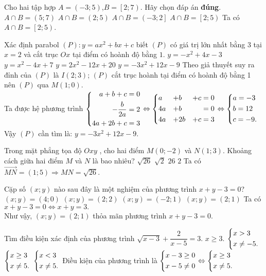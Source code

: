 \begin{ex}%
Cho hai tập hợp  $A=\left( -3;5 \right)$,$B=\left[ 2;7 \right)$. Hãy chọn đáp án \textbf{đúng}.
\choice
{ $A\cap B=\left( 5;7 \right)$}
{ $A\cap B=\left( 2;5 \right)$}
{ $A\cap B=\left( -3;2 \right]$}
{\True  $A\cap B=\left[ 2;5 \right)$}
	\loigiai
	{Ta có $A\cap B=\left[ 2;5 \right)$.
	}
\end{ex}
\begin{ex}%
 Xác định parabol $(P):y=ax^2+bx+c$  biết $(P)$ có giá trị lớn nhất bằng $3$ tại $x=2$ và cắt trục $Ox$ tại điểm có hoành độ bằng $1$.
\choice
{ $y=-x^2+4x-3$}
{ $y=x^2-4x+7$}
{ $y=2x^2-12x+20$}
{\True  $y=-3x^2+12x-9$}
\loigiai
	{Theo giả thuyết suy ra đỉnh của $ (P) $ là $ I(2;3) $; $ (P) $ cắt trục hoành tại điểm có hoành độ bằng 1 nên $ (P)  $ qua $ M(1;0) $.\\
		Ta được hệ phương trình $ \left\{\begin{aligned}a+b+c=0\\-\dfrac{b}{2a} = 2\\4a + 2b + c = 3\end{aligned}\right. \Leftrightarrow \left\{\begin{aligned}&a&+&b&+c &= 0\\ &4a &+&b{}&{} &= 0\\&4a &+&2b &+c &= 3\end{aligned}\right. \Leftrightarrow \left\{\begin{aligned}&a = -3\\&b=12\\&c=-9.\end{aligned}\right. $\\
		Vậy $ (P) $ cần tìm là: $y=-3x^2+12x-9.  $
	}
\end{ex}
\begin{ex}%
Trong mặt phẳng tọa độ  $Oxy$ , cho hai điểm  $M\left( 0;-2 \right)$ và $N\left( 1;3 \right)$. Khoảng cách giữa hai điểm $M$ và $N$ là bao nhiêu?
\choice
{\True $\sqrt{26}$}
{$\sqrt{2}$}
{$26$}
{$2$}
	\loigiai
	{Ta có $ \vec{MN} = (1;5) \Rightarrow MN = \sqrt{26}. $
	}
\end{ex}
\begin{ex}%
 Cặp số $\left( x;y \right)$ nào sau đây là một nghiệm của phương trình $x+y-3=0$?
\choice
{$\left( x;y \right)=\left( 4;0 \right)$}
{$\left( x;y \right)=\left( 2;2 \right)$}
{$\left( x;y \right)=\left( -2;1 \right)$}
{\True $\left( x;y \right)=\left( 2;1 \right)$
}
	\loigiai
	{Ta có $x+y-3=0 \Leftrightarrow x + y = 3.$\\
		Như vậy, $\left( x;y \right)=\left( 2;1 \right)$ thỏa mãn phương trình $x+y-3=0$.
	}
\end{ex}
\begin{ex}%
Tìm điều kiện xác định của phương trình  $\sqrt{x-3}+\dfrac{2}{x-5}=3$.
\def\dotEX{}
\choice
{$x\ge 3$.}
{$ \left\{\begin{aligned}&x>3\\&x \ne -5.\end{aligned}\right. $}
{\True $\left\{\begin{aligned}& x \ge 3\\&x \ne 5.\end{aligned}\right.$}
{$\left\{\begin{aligned}&x<3 \\&x \ne 5.\end{aligned}\right.$}
	\loigiai
	{Điều kiện của phương trình là $ \left\{\begin{aligned}&x-3 \geq 0\\&x - 5 \ne 0\end{aligned}\right. \Leftrightarrow \left\{\begin{aligned}&x \ge 3\\&x \ne 5.\end{aligned}\right.$
	}
\end{ex}
